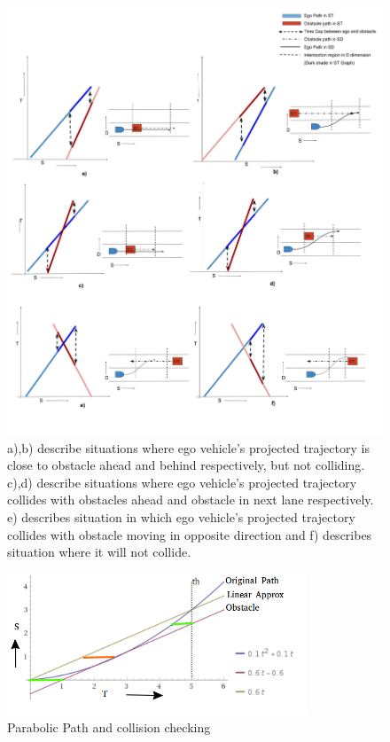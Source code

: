 \begin{figure}
	\centering
	\includegraphics[width=1.1\textwidth]{Images/concept/dynamic_collision_lines.jpg}
	\caption{a),b) describe situations where ego vehicle's projected trajectory is close to obstacle ahead and behind respectively, but not colliding. \newline 
		c),d) describe situations where ego vehicle's projected trajectory collides with obstacles ahead and obstacle in next lane respectively. \newline
		e) describes situation in which ego vehicle's projected trajectory collides with obstacle moving in opposite direction and f) describes situation where it will not collide. 
	}
	\label{dynamic_obst_all}
\end{figure}


 \begin{figure}
	\centering
	\includegraphics[width=0.8\textwidth]{Images/concept/dynamic_obstacle_new.png}
	\caption{Parabolic Path and collision checking}
	\label{dynamic_approx}
\end{figure}

